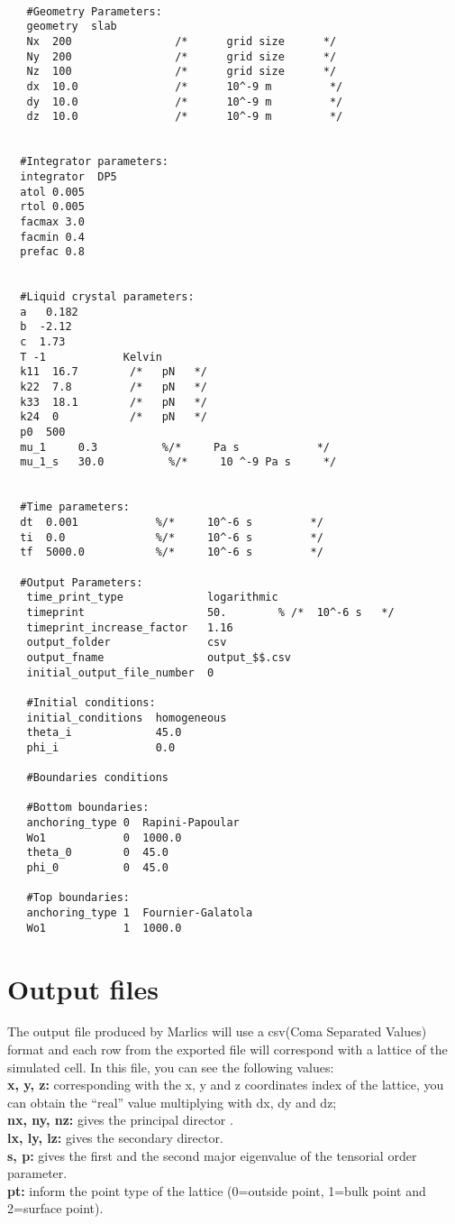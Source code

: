 \documentclass{article}
\begin{document}
\begin{lstlisting}	

   #Geometry Parameters:
   geometry  slab
   Nx  200                /*      grid size      */
   Ny  200                /*      grid size      */
   Nz  100                /*      grid size      */
   dx  10.0               /*      10^-9 m         */
   dy  10.0               /*      10^-9 m         */
   dz  10.0               /*      10^-9 m         */


  #Integrator parameters:
  integrator  DP5
  atol 0.005
  rtol 0.005
  facmax 3.0
  facmin 0.4
  prefac 0.8


  #Liquid crystal parameters:
  a   0.182
  b  -2.12
  c  1.73
  T -1            Kelvin
  k11  16.7        /*   pN   */
  k22  7.8         /*   pN   */
  k33  18.1        /*   pN   */
  k24  0           /*   pN   */ 
  p0  500
  mu_1     0.3          %/*     Pa s            */
  mu_1_s   30.0          %/*     10 ^-9 Pa s     */


  #Time parameters:
  dt  0.001            %/*     10^-6 s         */	
  ti  0.0              %/*     10^-6 s         */	
  tf  5000.0           %/*     10^-6 s         */

  #Output Parameters:
   time_print_type             logarithmic
   timeprint                   50.        % /*  10^-6 s   */
   timeprint_increase_factor   1.16            
   output_folder               csv
   output_fname                output_$$.csv
   initial_output_file_number  0	

   #Initial conditions:
   initial_conditions  homogeneous
   theta_i             45.0
   phi_i               0.0	

   #Boundaries conditions

   #Bottom boundaries:
   anchoring_type 0  Rapini-Papoular
   Wo1            0  1000.0
   theta_0        0  45.0
   phi_0          0  45.0	

   #Top boundaries:
   anchoring_type 1  Fournier-Galatola
   Wo1            1  1000.0

\end{lstlisting}
\section{Output files}

The output file produced by Marlics will use a csv(Coma Separated Values) format and each row from the exported file will correspond with a lattice of the simulated cell. In this file, you can see the following values:\\
\textbf{x, y, z:} corresponding with the x, y and z coordinates index of the lattice, you can obtain the ``real'' value multiplying with dx, dy and dz;\\
\textbf{nx, ny, nz:} gives the principal director .\\
\textbf{lx, ly, lz:} gives the secondary director.\\
\textbf{s, p:} gives the first and the second major eigenvalue of the tensorial order parameter.\\ 
\textbf{pt:} inform the point type of the lattice (0=outside point, 1=bulk point and 2=surface point).
\end{document}
